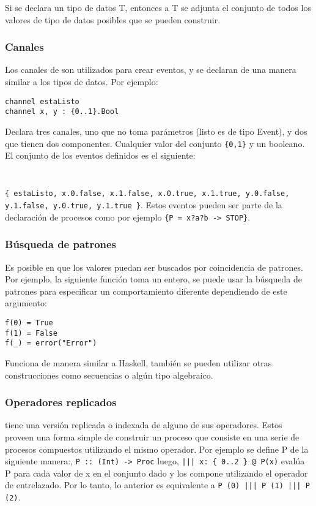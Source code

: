 Si se declara un tipo de datos T, entonces a T se adjunta el conjunto de todos los valores de tipo de datos posibles que se pueden construir. 

\subsubsection{Canales}

Los canales de \CSPm son utilizados para crear eventos, y se declaran de una manera similar a los tipos de datos. Por ejemplo:

\begin{verbatim}
channel estaListo
channel x, y : {0..1}.Bool
\end{verbatim}

Declara tres canales, uno que no toma parámetros (listo es de tipo Event), y dos que tienen dos componentes. Cualquier valor del conjunto \verb={0,1}= y un booleano. El conjunto de los eventos definidos es el siguiente: 
\begin{verbatim}
	
\end{verbatim}
\verb={ estaListo, x.0.false, x.1.false, x.0.true, x.1.true, y.0.false, y.1.false, y.0.true, y.1.true }=. Estos eventos pueden ser parte de la declaración de procesos como por ejemplo \verb#{P = x?a?b -> STOP}#.

\subsubsection{Búsqueda de patrones}

Es posible en \CSP que los valores puedan ser buscados por coincidencia de patrones. Por ejemplo, la siguiente función toma un entero, se puede usar la búsqueda de patrones para especificar un comportamiento diferente dependiendo de este argumento:

\begin{verbatim}
f(0) = True
f(1) = False
f(_) = error("Error")
\end{verbatim}

Funciona de manera similar a Haskell, también se pueden utilizar otras construcciones como secuencias o algún tipo algebraico.

\subsubsection{Operadores replicados}
\FDR tiene una versión replicada o indexada de alguno de sus operadores. Estos proveen una forma simple de construir un proceso que consiste en una serie de procesos compuestos utilizando el mismo operador. Por ejemplo se define P de la siguiente manera:, \verb=P :: (Int) -> Proc= luego, \verb=||| x: { 0..2 } @ P(x)= evalúa P para cada valor de x en el conjunto dado y los compone utilizando el operador de entrelazado. Por lo tanto, lo anterior es equivalente a \verb=P (0) ||| P (1) ||| P (2)=.



